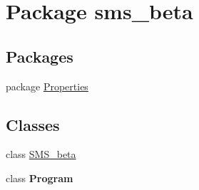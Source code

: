\hypertarget{namespacesms__beta}{
\section{Package sms\_\-beta}
\label{namespacesms__beta}
}
\subsection*{Packages}
\begin{DoxyCompactItemize}
\item 
package \hyperlink{namespacesms__beta_1_1_properties}{Properties}
\end{DoxyCompactItemize}
\subsection*{Classes}
\begin{DoxyCompactItemize}
\item 
class \hyperlink{classsms__beta_1_1_s_m_s__beta}{SMS\_\-beta}
\item 
class {\bfseries Program}
\end{DoxyCompactItemize}
